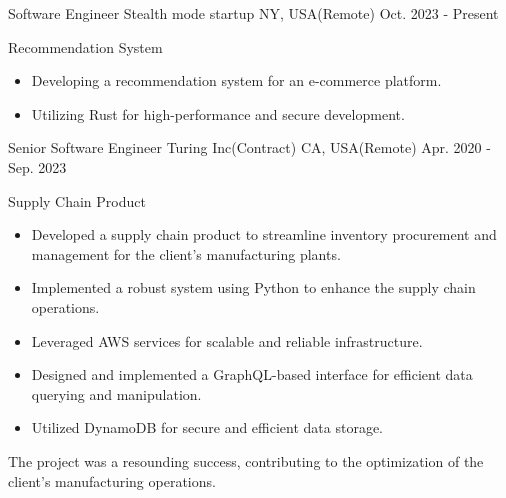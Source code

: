 

\begin{cventries}

  \cventry
  {Software Engineer} %
  {Stealth mode startup} %
  {NY, USA(Remote)} %
  {Oct. 2023 - Present} %
  {
    \begin{cvitems} %
      \item {Recommendation System}
      \begin {itemize}
        \item Developing a recommendation system for an e-commerce platform.
        \item Utilizing Rust for high-performance and secure development.
      \end{itemize}
    \end{cvitems}
  }
  \cventry
    {Senior Software Engineer} %
    {Turing Inc(Contract)} %
    {CA, USA(Remote)} %
    {Apr. 2020 - Sep. 2023} %
    {
      \begin{cvitems} %
        \item {Supply Chain Product}
        \begin {itemize}
          \item Developed a supply chain product to streamline inventory procurement and management for the client's manufacturing plants.
          \item Implemented a robust system using Python to enhance the supply chain operations.
          \item Leveraged AWS services for scalable and reliable infrastructure.
          \item Designed and implemented a GraphQL-based interface for efficient data querying and manipulation.
          \item Utilized DynamoDB for secure and efficient data storage.
          \end{itemize}
        The project was a resounding success, contributing to the optimization of the client's manufacturing operations.

\end{cvitems}}
\end{cventries}
